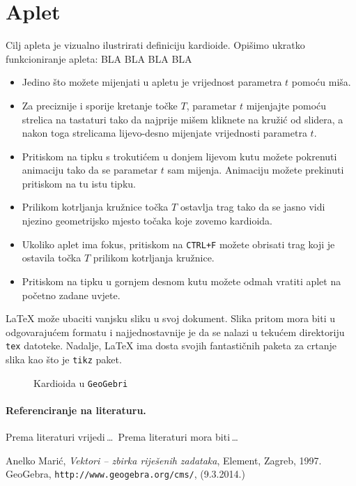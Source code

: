 \documentclass[a4paper,12pt]{article}
\begin{document}
\section{Aplet}
Cilj apleta je vizualno ilustrirati definiciju kardioide. Opišimo ukratko funkcioniranje apleta: BLA BLA BLA BLA
\begin{itemize}
\item Jedino što možete mijenjati u apletu je vrijednost parametra $t$ pomoću miša.
\item Za preciznije i sporije kretanje točke $T$, parametar $t$ mijenjajte pomoću strelica na tastaturi 
tako da najprije mišem kliknete na kružić od slidera, a nakon toga strelicama lijevo-desno mijenjate vrijednosti parametra $t$.
\item Pritiskom na tipku s trokutićem u donjem lijevom kutu možete pokrenuti animaciju tako da se parametar $t$ sam mijenja. Animaciju možete prekinuti pritiskom na tu istu tipku.
\item Prilikom kotrljanja kružnice točka $T$ ostavlja trag tako da se jasno vidi njezino geometrijsko mjesto točaka koje zovemo kardioida.
\item Ukoliko aplet ima fokus, pritiskom na \verb|CTRL+F| možete obrisati trag koji je ostavila točka $T$ prilikom kotrljanja kružnice.
\item Pritiskom na tipku u gornjem desnom kutu možete odmah vratiti aplet na početno zadane uvjete.
\end{itemize}
\LaTeX{} može ubaciti vanjsku sliku u svoj dokument. Slika pritom mora biti u odgovarajućem formatu i najjednostavnije je da se nalazi u tekućem
direktoriju \verb|tex| datoteke. Nadalje, \LaTeX{} ima dosta svojih fantastičnih paketa za crtanje slika kao što je \verb|tikz| paket.\par
\vspace*{5mm}
\begin{figure}[!h]
\centering

\caption{Kardioida u \texttt{GeoGebri}}
\end{figure}

\paragraph{Referenciranje na literaturu.} Prema literaturi \cite{Maric} vrijedi\,\ldots \ Prema literaturi \cite{geo} mora biti\,\ldots

\begin{thebibliography}{9}
 An\dj elko Mari\'c, \emph{Vektori -- zbirka rije\v{s}enih zadataka}, Element, Zagreb, 1997.
 GeoGebra, \texttt{http://www.geogebra.org/cms/}, (9.3.2014.)
\end{thebibliography}
\end{document}
